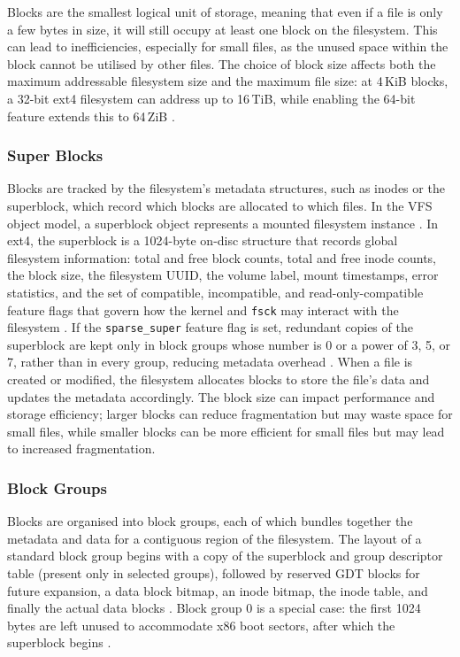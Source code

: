 Blocks are the smallest logical unit of storage, meaning that even if a file is only a few bytes in size, it will still occupy at least one block on the filesystem. This can lead to inefficiencies, especially for small files, as the unused space within the block cannot be utilised by other files. The choice of block size affects both the maximum addressable filesystem size and the maximum file size: at 4\,KiB blocks, a 32-bit ext4 filesystem can address up to 16\,TiB, while enabling the 64-bit feature extends this to 64\,ZiB \parencite{KernelExt4Blocks}.

\subsubsection{Super Blocks}
\label{SuperBlocks}

Blocks are tracked by the filesystem's metadata structures, such as inodes or the superblock, which record which blocks are allocated to which files. In the VFS object model, a superblock object represents a mounted filesystem instance \parencite{KernelVFS}. In ext4, the superblock is a 1024-byte on-disc structure that records global filesystem information: total and free block counts, total and free inode counts, the block size, the filesystem UUID, the volume label, mount timestamps, error statistics, and the set of compatible, incompatible, and read-only-compatible feature flags that govern how the kernel and \texttt{fsck} may interact with the filesystem \parencite{KernelExt4Super}. If the \texttt{sparse\_super} feature flag is set, redundant copies of the superblock are kept only in block groups whose number is 0 or a power of 3, 5, or 7, rather than in every group, reducing metadata overhead \parencite{KernelExt4Super}. When a file is created or modified, the filesystem allocates blocks to store the file's data and updates the metadata accordingly. The block size can impact performance and storage efficiency; larger blocks can reduce fragmentation but may waste space for small files, while smaller blocks can be more efficient for small files but may lead to increased fragmentation.

\subsubsection{Block Groups}
\label{BlockGroups}

Blocks are organised into block groups, each of which bundles together the metadata and data for a contiguous region of the filesystem. The layout of a standard block group begins with a copy of the superblock and group descriptor table (present only in selected groups), followed by reserved GDT blocks for future expansion, a data block bitmap, an inode bitmap, the inode table, and finally the actual data blocks \parencite{KernelExt4BlockGroup}. Block group 0 is a special case: the first 1024 bytes are left unused to accommodate x86 boot sectors, after which the superblock begins \parencite{KernelExt4BlockGroup}.

